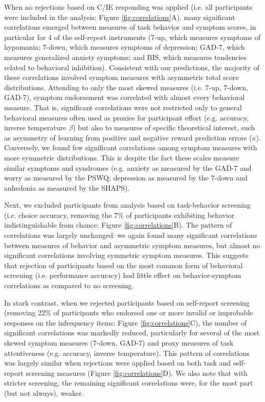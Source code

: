 \documentclass[a4paper,notitlepage,12pt]{article}
\begin{document}
\begin{refsection}[main]
When no rejections based on C/IE responding was applied (i.e. all participants were included in the analysis; Figure \ref{fig:correlations}A), many significant correlations emerged between measures of task behavior and symptom scores, in particular for 4 of the self-report instruments (7-up, which measures symptoms of hypomania; 7-down, which measures symptoms of depression; GAD-7, which measures generalized anxiety symptoms; and BIS, which measures tendencies related to behavioral inhibition). Consistent with our predictions, the majority of these correlations involved symptom measures with asymmetric total score distributions. Attending to only the most skewed measures (i.e. 7-up, 7-down, GAD-7), symptom endorsement was correlated with almost every behavioral measure. That is, significant correlations were not restricted only to general behavioral measures often used as proxies for participant effort (e.g. accuracy, inverse temperature $\beta$) but also to measures of specific theoretical interest, such as asymmetry of learning from positive and negative reward prediction errors ($\kappa$). Conversely, we found few significant correlations among symptom measures with more symmetric distributions. This is despite the fact these scales measure similar symptoms and syndromes (e.g. anxiety as measured by the GAD-7 and worry as measured by the PSWQ; depression as measured by the 7-down and anhedonia as measured by the SHAPS). 

Next, we excluded participants from analysis based on task-behavior screening (i.e. choice accuracy, removing the 7\% of participants exhibiting behavior indistinguishable from chance; Figure \ref{fig:correlations}B). The pattern of correlations was largely unchanged: we again found many significant correlations between measures of behavior and asymmetric symptom measures, but almost no significant correlations involving symmetric symptom measures. This suggests that rejection of participants based on the most common form of behavioral screening (i.e. performance accuracy) had little effect on behavior-symptom correlations as compared to no screening.  

In stark contrast, when we rejected participants based on self-report screening  (removing 22\% of participants who endorsed one or more invalid or improbable responses on the infrequency items; Figure \ref{fig:correlations}C), the number of significant correlations was markedly reduced, particularly for several of the most skewed symptom measures (7-down, GAD-7) and proxy measures of task attentiveness (e.g. accuracy, inverse temperature). This pattern of correlations was largely similar when rejections were applied based on both task and self-report screening measures (Figure \ref{fig:correlations}D). We also note that with stricter screening, the remaining significant correlations were, for the most part (but not always), weaker. 


\end{refsection}
\end{document}
